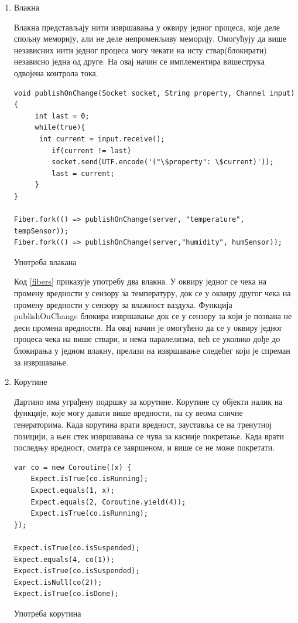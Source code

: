 \documentclass[12pt,oneside]{memoir}
\begin{document}
\begin{enumerate}
\item Влакна

Влакна представљају нити извршавања у оквиру једног процеса, које деле спољну меморију, али не деле непроменљиву меморију. Омогућују да више независних нити једног процеса могу чекати на исту ствар(блокирати) независно једна од друге. На овај начин се имплементира вишеструка одвојена контрола тока.

\begin{listing}
\begin{verbatim}
void publishOnChange(Socket socket, String property, Channel input){
  	 int last = 0;
  	 while(true){
   	  int current = input.receive();
    	 if(current != last)
      	 socket.send(UTF.encode('("\$property": \$current)'));
    	 last = current;
  	 }
}

Fiber.fork(() => publishOnChange(server, "temperature", tempSensor));
Fiber.fork(() => publishOnChange(server,"humidity", humSensor));
\end{verbatim}
\caption{Употреба влакана}
\label{fibers}
\end{listing}

Код \ref{fibers} приказује употребу два влакна. У оквиру једног се чека на промену вредности у сензору за температуру, док се у оквиру другог чека на промену вредности у сензору за влажност ваздуха. Функција publishOnChange блокира извршавање док се у сензору за који је позвана не деси промена вредности. На овај начин је омогућено да се у оквиру једног процеса чека на више ствари, и нема паралелизма, већ се уколико дође до блокирања у једном влакну, прелази на извршавање следећег који је спреман за извршавање.

\item Корутине

Дартино има уграђену подршку за корутине. Корутине су објекти налик на функције, које могу давати више вредности, па су веома сличне генераторима. Када корутина врати вредност, зауставља се на тренутној позицији, а њен стек извршавања се чува за касније покретање. Када врати последњу вредност, сматра се завршеном, и више се не може покретати.

\begin{listing}
\begin{verbatim}
var co = new Coroutine((x) {
    Expect.isTrue(co.isRunning);
    Expect.equals(1, x);
    Expect.equals(2, Coroutine.yield(4));
    Expect.isTrue(co.isRunning);
});

Expect.isTrue(co.isSuspended);
Expect.equals(4, co(1));
Expect.isTrue(co.isSuspended);
Expect.isNull(co(2));
Expect.isTrue(co.isDone);
\end{verbatim}
\caption{Употреба корутина}
\label{coroutines}
\end{listing}


\end{enumerate}
\end{document}
